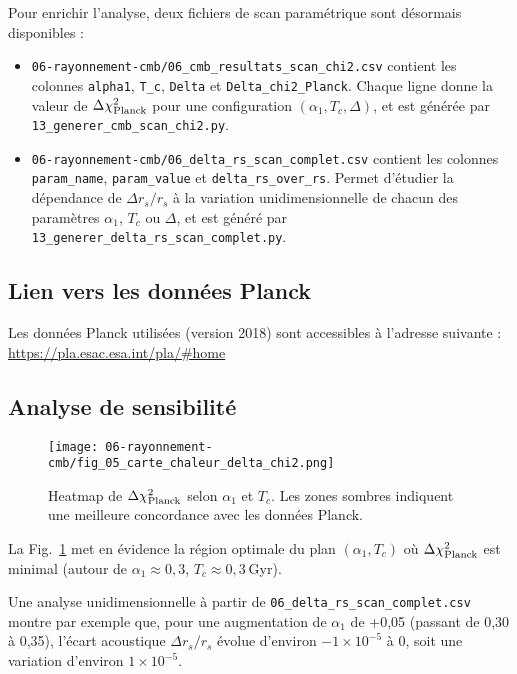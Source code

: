Pour enrichir l’analyse, deux fichiers de scan paramétrique sont désormais disponibles :

\begin{itemize}
  \item \texttt{06-rayonnement-cmb/06\_cmb\_resultats\_scan\_chi2.csv}
        contient les colonnes \texttt{alpha1}, \texttt{T\_c}, \texttt{Delta} et \texttt{Delta\_chi2\_Planck}.
        Chaque ligne donne la valeur de \(\Delta\chi^2_{\rm Planck}\) pour une configuration \((\alpha_{1},T_{c},\Delta)\),
        et est générée par \texttt{13\_generer\_cmb\_scan\_chi2.py}.
  \item \texttt{06-rayonnement-cmb/06\_delta\_rs\_scan\_complet.csv}
        contient les colonnes \texttt{param\_name}, \texttt{param\_value} et \texttt{delta\_rs\_over\_rs}.
        Permet d’étudier la dépendance de \(\Delta r_{s}/r_{s}\) à la variation unidimensionnelle de chacun des paramètres \(\alpha_{1}\), \(T_{c}\) ou \(\Delta\),
        et est généré par \texttt{13\_generer\_delta\_rs\_scan\_complet.py}.
\end{itemize}

\subsection*{Lien vers les données Planck}

Les données Planck utilisées (version 2018) sont accessibles à l’adresse suivante :
\url{https://pla.esac.esa.int/pla/#home}

\subsection{Analyse de sensibilité}

\begin{figure}[htbp]
  \centering
  \texttt{[image: 06-rayonnement-cmb/fig\_05\_carte\_chaleur\_delta\_chi2.png]}
  \caption{Heatmap de \(\Delta\chi^2_{\rm Planck}\) selon \(\alpha_{1}\) et \(T_c\). Les zones sombres indiquent une meilleure concordance avec les données Planck.}
  \label{fig:carte_chaleur_delta_chi2}
\end{figure}

\noindent
La Fig.~\ref{fig:carte_chaleur_delta_chi2} met en évidence la région optimale du plan \((\alpha_{1},T_c)\) où \(\Delta\chi^2_{\rm Planck}\) est minimal (autour de \(\alpha_{1}\approx0{,}3\), \(T_c\approx0{,}3\) Gyr).

\medskip
\noindent
Une analyse unidimensionnelle à partir de \texttt{06\_delta\_rs\_scan\_complet.csv} montre par exemple que,
pour une augmentation de \(\alpha_{1}\) de +0,05 (passant de 0,30 à 0,35),
l’écart acoustique \(\Delta r_{s}/r_{s}\) évolue d’environ \(-1\times10^{-5}\) à \(0\),
soit une variation d’environ \(1\times10^{-5}\).

